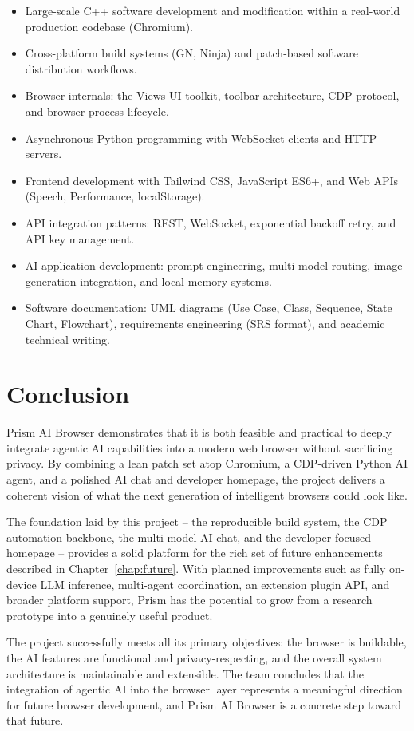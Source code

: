 \begin{itemize}[leftmargin=*]
    \item Large-scale C++ software development and modification within a real-world production codebase (Chromium).
    \item Cross-platform build systems (GN, Ninja) and patch-based software distribution workflows.
    \item Browser internals: the Views UI toolkit, toolbar architecture, CDP protocol, and browser process lifecycle.
    \item Asynchronous Python programming with WebSocket clients and HTTP servers.
    \item Frontend development with Tailwind CSS, JavaScript ES6+, and Web APIs (Speech, Performance, localStorage).
    \item API integration patterns: REST, WebSocket, exponential backoff retry, and API key management.
    \item AI application development: prompt engineering, multi-model routing, image generation integration, and local memory systems.
    \item Software documentation: UML diagrams (Use Case, Class, Sequence, State Chart, Flowchart), requirements engineering (SRS format), and academic technical writing.
\end{itemize}

\section{Conclusion}
Prism AI Browser demonstrates that it is both feasible and practical to deeply integrate agentic AI capabilities into a modern web browser without sacrificing privacy. By combining a lean patch set atop Chromium, a CDP-driven Python AI agent, and a polished AI chat and developer homepage, the project delivers a coherent vision of what the next generation of intelligent browsers could look like.

The foundation laid by this project -- the reproducible build system, the CDP automation backbone, the multi-model AI chat, and the developer-focused homepage -- provides a solid platform for the rich set of future enhancements described in Chapter~\ref{chap:future}. With planned improvements such as fully on-device LLM inference, multi-agent coordination, an extension plugin API, and broader platform support, Prism has the potential to grow from a research prototype into a genuinely useful product.

The project successfully meets all its primary objectives: the browser is buildable, the AI features are functional and privacy-respecting, and the overall system architecture is maintainable and extensible. The team concludes that the integration of agentic AI into the browser layer represents a meaningful direction for future browser development, and Prism AI Browser is a concrete step toward that future.

